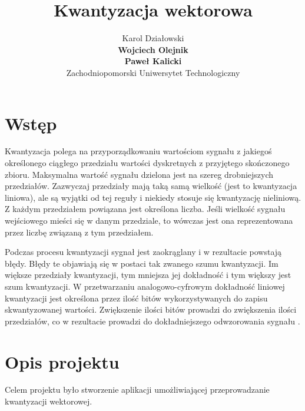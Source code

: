 \documentclass{article}
\title{Kwantyzacja wektorowa}
\author{
  Karol Działowski \\
  \textbf{Wojciech Olejnik} \\
  \textbf{Paweł Kalicki} \\
  Zachodniopomorski Uniwersytet Technologiczny
}
\begin{document}
\maketitle
\begin{abstract}
\lipsum[1-2]
\end{abstract}

\newpage

\tableofcontents

\newpage



\section{Wstęp}

Kwantyzacja polega na przyporządkowaniu wartościom sygnału z jakiegoś określonego ciągłego przedziału wartości dyskretnych z przyjętego skończonego zbioru. Maksymalna wartość sygnału dzielona jest na szereg drobniejszych przedziałów. Zazwyczaj przedziały mają taką samą wielkość (jest to kwantyzacja liniowa), ale są wyjątki od tej reguły i niekiedy stosuje się kwantyzację nieliniową. Z każdym przedziałem powiązana jest określona liczba. Jeśli wielkość sygnału wejściowego mieści się w danym przedziale, to wówczas jest ona reprezentowana przez liczbę związaną z tym przedziałem.

Podczas procesu kwantyzacji sygnał jest zaokrąglany i w rezultacie powstają błędy. Błędy te objawiają się w postaci tak zwanego szumu kwantyzacji. Im większe przedziały kwantyzacji, tym mniejsza jej dokładność i tym większy jest szum kwantyzacji. W przetwarzaniu analogowo-cyfrowym dokładność liniowej kwantyzacji jest określona przez ilość bitów wykorzystywanych do zapisu skwantyzowanej wartości. Zwiększenie ilości bitów prowadzi do zwiększenia ilości przedziałów, co w rezultacie prowadzi do dokładniejszego odwzorowania sygnału \cite{drozdek2007wprowadzenie}.

\section{Opis projektu}

Celem projektu było stworzenie aplikacji umożliwiającej przeprowadzanie kwantyzacji wektorowej.
\end{document}
